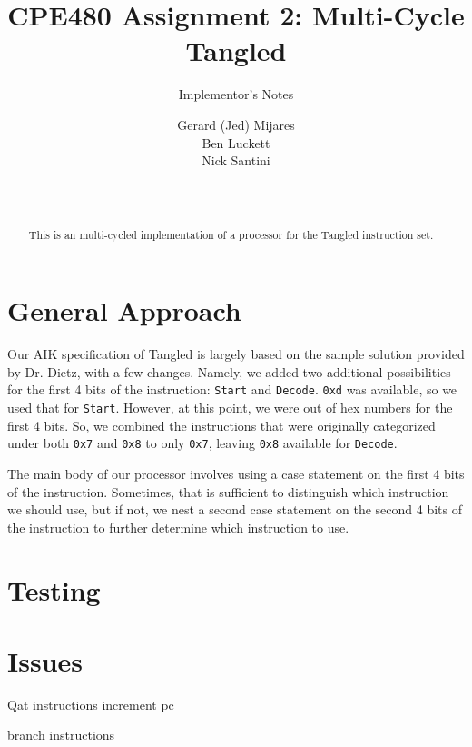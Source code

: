 \documentclass{sig-alternate-05-2015}
\begin{document}

\title{CPE480 Assignment 2: Multi-Cycle Tangled }
\subtitle{Implementor's Notes}

\author{
Gerard (Jed) Mijares\\
Ben Luckett\\
Nick Santini\\
       \\
       \\
}


\maketitle
\begin{abstract}
This is an multi-cycled implementation of a processor for the Tangled instruction set.
\end{abstract}

\section{General Approach}

Our AIK specification of Tangled is largely based on the sample solution provided by Dr. Dietz, with a few changes. Namely, we added two additional possibilities for the first 4 bits of the instruction: \texttt{Start} and \texttt{Decode}. \texttt{0xd} was available, so we used that for \texttt{Start}. However, at this point, we were out of hex numbers for the first 4 bits. So, we combined the instructions that were originally categorized under both \texttt{0x7} and \texttt{0x8} to only \texttt{0x7}, leaving \texttt{0x8} available for \texttt{Decode}.

The main body of our processor involves using a case statement on the first 4 bits of the instruction. Sometimes, that is sufficient to distinguish which instruction we should use, but if not, we nest a second case statement on the second 4 bits of the instruction to further determine which instruction to use.

\vfill\pagebreak

\section{Testing}

\section{Issues}

Qat instructions increment pc

branch instructions
\end{document}
